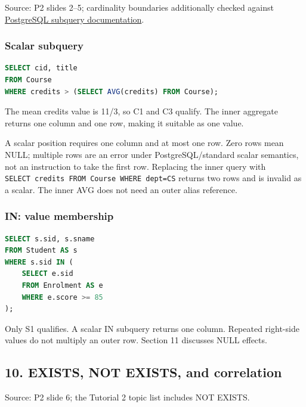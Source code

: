 Source: P2 slides 2--5; cardinality boundaries additionally checked against \href{https://www.postgresql.org/docs/18/functions-subquery.html}{PostgreSQL subquery documentation}.

\subsubsection{Scalar subquery}\label{06_sql_queries_en-scalar-subquery}

\Needspace{75pt}
\begin{lstlisting}[language=SQL]
SELECT cid, title
FROM Course
WHERE credits > (SELECT AVG(credits) FROM Course);
\end{lstlisting}

The mean credits value is 11/3, so C1 and C3 qualify. The inner aggregate returns one column and one row, making it suitable as one value.

A scalar position requires one column and at most one row. Zero rows mean NULL; multiple rows are an error under PostgreSQL/standard scalar semantics, not an instruction to take the first row. Replacing the inner query with \texttt{SELECT\ credits\ FROM\ Course\ WHERE\ dept=\textquotesingle{}CS\textquotesingle{}} returns two rows and is invalid as a scalar. The inner AVG does not need an outer alias reference.

\subsubsection{IN: value membership}\label{06_sql_queries_en-in-value-membership}

\Needspace{135pt}
\begin{lstlisting}[language=SQL]
SELECT s.sid, s.sname
FROM Student AS s
WHERE s.sid IN (
    SELECT e.sid
    FROM Enrolment AS e
    WHERE e.score >= 85
);
\end{lstlisting}

Only S1 qualifies. A scalar IN subquery returns one column. Repeated right-side values do not multiply an outer row. Section 11 discusses NULL effects.

\subsection{10. EXISTS, NOT EXISTS, and correlation}\label{06_sql_queries_en-exists-not-exists-and-correlation}

Source: P2 slide 6; the Tutorial 2 topic list includes NOT EXISTS.

